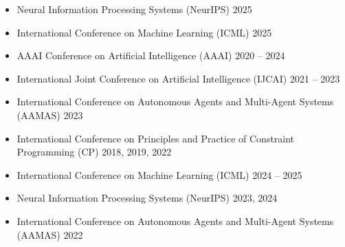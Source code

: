 \begin{itemize}
  \item Neural Information Processing Systems (NeurIPS)  \hfill {2025}
  \item International Conference on Machine Learning (ICML) \hfill {2025}
  \item AAAI Conference on Artificial Intelligence (AAAI) \hfill {2020 -- 2024}
  \item International Joint Conference on Artificial Intelligence (IJCAI) \hfill {2021 -- 2023}
  \item International Conference on Autonomous Agents and Multi-Agent Systems (AAMAS) \hfill {2023}
  \item International Conference on Principles and Practice of Constraint Programming (CP) \hfill{2018, 2019, 2022} 
\end{itemize}

\begin{itemize}
  \item International Conference on Machine Learning (ICML) \hfill 2024 -- 2025

  \item Neural Information Processing Systems (NeurIPS)  \hfill {2023, 2024}

  \item International Conference on Autonomous Agents and Multi-Agent Systems (AAMAS) \hfill {2022}
\end{itemize}


